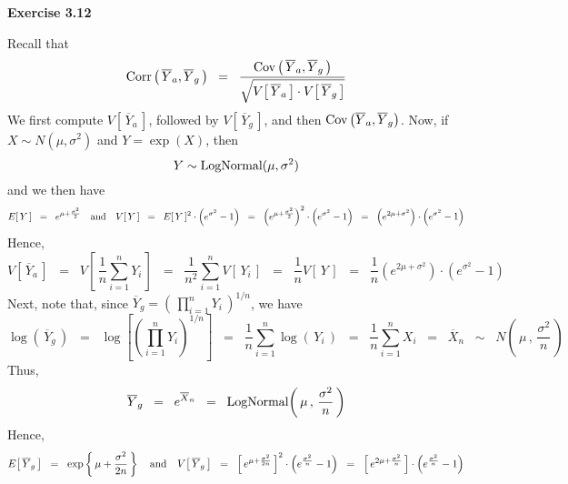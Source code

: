 
\noindent
\textbf{Exercise 3.12}

\vskip 0.3cm
\noindent

Recall that
\begin{equation*}
\textnormal{Corr}\left(\,\overline{Y}_{a},\overline{Y}_{g}\,\right)
\;\;=\;\;
\dfrac{\textnormal{Cov}\left(\,\overline{Y}_{a},\overline{Y}_{g}\,\right)}
{\sqrt{V\!\left[\,\overline{Y}_{a}\,\right]\cdot V\!\left[\,\overline{Y}_{g}\,\right]}}
\end{equation*}
We first compute $V\!\left[\,\overline{Y}_{a}\,\right]$, followed by
$V\!\left[\,\overline{Y}_{g}\,\right]$, and then
$\textnormal{Cov}\left(\overline{Y}_{a},\overline{Y}_{g}\right)$.
Now, if $X \sim N(\mu,\sigma^{2})$ and $Y = \exp(X)$, then
\begin{equation*}
Y \sim \textnormal{LogNormal}(\mu,\sigma^{2})
\end{equation*}
and we then have
\begin{equation*}
E[\,Y\,] \;\; = \;\; e^{\mu + \frac{\sigma^{2}}{2}}
\quad\textnormal{and}\quad
V[\,Y\,]
\;\; = \;\; E[\,Y\,]^{2}\cdot\left(e^{\sigma^{2}}-1\right)
\;\; = \;\; \left(e^{\mu+\frac{\sigma^{2}}{2}}\right)^{2}\cdot\left(e^{\sigma^{2}}-1\right)
\;\; = \;\; \left(e^{2\mu+\sigma^{2}}\right)\cdot\left(e^{\sigma^{2}}-1\right)
\end{equation*}
Hence,
\begin{equation*}
V\left[\,\overline{Y}_{a}\,\right]
\;\; = \;\;
V\left[\,\dfrac{1}{n}\sum_{i=1}^{n}Y_{i}\,\right]
\;\; = \;\;
\dfrac{1}{n^{2}}\sum_{i=1}^{n}V\left[\,Y_{i}\,\right]
\;\; = \;\;
\dfrac{1}{n}V\left[\,Y\,\right]
\;\; = \;\;
\dfrac{1}{n} \left(e^{2\mu+\sigma^{2}}\right)\cdot\left(e^{\sigma^{2}}-1\right)
\end{equation*}
Next, note that, since $\overline{Y}_{g} = \left(\,\prod_{i=1}^{n}Y_{i}\,\right)^{1/n}$,
we have
\begin{equation*}
\log\left(\,\overline{Y}_{g}\,\right)
\;\; = \;\;
\log\left[\left(\prod_{i=1}^{n}Y_{i}\right)^{1/n}\right]
\;\; = \;\;
\dfrac{1}{n}\sum_{i=1}^{n}\log\left(\,Y_{i}\,\right)
\;\; = \;\;
\dfrac{1}{n}\sum_{i=1}^{n}X_{i}
\;\; = \;\;
\overline{X}_{n}
\;\; \sim \;\;
N\!\left(\,\mu\,,\,\dfrac{\sigma^{2}}{n}\,\right)
\end{equation*}
Thus,
\begin{equation*}
\overline{Y}_{g}
\;\; = \;\;
e^{\overline{X}_{n}}
\;\; = \;\;
\textnormal{LogNormal}\!\left(\,\mu\,,\,\dfrac{\sigma^{2}}{n}\,\right)
\end{equation*}
Hence,
\begin{equation*}
E\!\left[\,\overline{Y}_{g}\,\right]
\;\;=\;\;
\exp\left\{\,\mu+\frac{\sigma^{2}}{2n}\,\right\}
\quad\textnormal{and}\quad
V\!\left[\,\overline{Y}_{g}\,\right]
\;\; = \;\;
\left[\,e^{\mu+\frac{\sigma^{2}}{2n}}\,\right]^{2}
\cdot
\left(e^{\frac{\sigma^{2}}{n}} - 1\right)
\;\; = \;\;
\left[\,e^{2\mu+\frac{\sigma^{2}}{n}}\,\right]
\cdot
\left(e^{\frac{\sigma^{2}}{n}} - 1\right)
\end{equation*}
